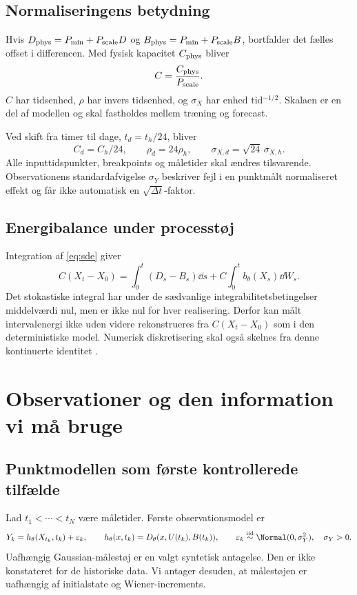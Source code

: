 \subsection{Normaliseringens betydning}
Hvis \(D_{\rm phys}=P_{\min}+P_{\rm scale}D\) og \(B_{\rm phys}=P_{\min}+P_{\rm scale}B\), bortfalder det fælles offset i differencen. Med fysisk kapacitet \(C_{\rm phys}\) bliver
\begin{equation}
 C=\frac{C_{\rm phys}}{P_{\rm scale}}.
 \label{eq:capacity_units}
\end{equation}
\(C\) har tidsenhed, \(\rho\) har invers tidsenhed, og \(\sigma_X\) har enhed tid\(^{-1/2}\). Skalaen er en del af modellen og skal fastholdes mellem træning og forecast.

Ved skift fra timer til dage, \(t_d=t_h/24\), bliver
\begin{equation}
 C_d=C_h/24,\qquad \rho_d=24\rho_h,\qquad
 \sigma_{X,d}=\sqrt{24}\,\sigma_{X,h}.
 \label{eq:time_units}
\end{equation}
Alle inputtidspunkter, breakpoints og måletider skal ændres tilsvarende. Observationens standardafvigelse \(\sigma_Y\) beskriver fejl i en punktmålt normaliseret effekt og får ikke automatisk en \(\sqrt{\Delta t}\)-faktor.

\subsection{Energibalance under processtøj}
Integration af \eqref{eq:sde} giver
\begin{equation}
 C(X_t-X_0)=\int_0^t(D_s-B_s)\dd s
        +C\int_0^t b_\theta(X_s)\dd W_s.
 \label{eq:energy}
\end{equation}
Det stokastiske integral har under de sædvanlige integrabilitetsbetingelser middelværdi nul, men er ikke nul for hver realisering. Derfor kan målt intervalenergi ikke uden videre rekonstrueres fra \(C(X_t-X_0)\) som i den deterministiske model. Numerisk diskretisering skal også skelnes fra denne kontinuerte identitet \cite{higham,repo}.

\section{Observationer og den information vi må bruge}
\subsection{Punktmodellen som første kontrollerede tilfælde}
Lad \(t_1<\cdots<t_N\) være måletider. Første observationsmodel er
\begin{equation}
 Y_k=h_\theta(X_{t_k},t_k)+\varepsilon_k,\qquad
 h_\theta(x,t_k)=D_\theta(x,U(t_k),B(t_k)),\qquad
 \varepsilon_k\overset{\rm iid}{\sim}\Normal(0,\sigma_Y^2),\quad\sigma_Y>0.
 \label{eq:observation}
\end{equation}
Uafhængig Gaussian-målestøj er en valgt syntetisk antagelse. Den er ikke konstateret for de historiske data. Vi antager desuden, at målestøjen er uafhængig af initialstate og Wiener-increments.

